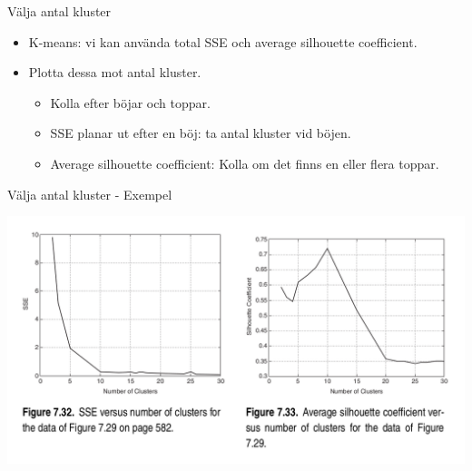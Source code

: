 \documentclass[10pt,english]{beamer}
\begin{document}
\begin{frame}{Välja antal kluster}

    \begin{itemize}
        \item K-means: vi kan använda total SSE och average silhouette coefficient.
        \item Plotta dessa mot antal kluster.
        \begin{itemize}
            \item Kolla efter böjar och toppar.
            \item SSE planar ut efter en böj: ta antal kluster vid böjen.
            \item Average silhouette coefficient: Kolla om det finns en eller flera toppar.
        \end{itemize}
    \end{itemize}
    
\end{frame}

\begin{frame}{Välja antal kluster - Exempel}

    \includegraphics[width=\textwidth]{figs/Determining the Correct Number of Clusters.png}
    
\end{frame}
\end{document}
